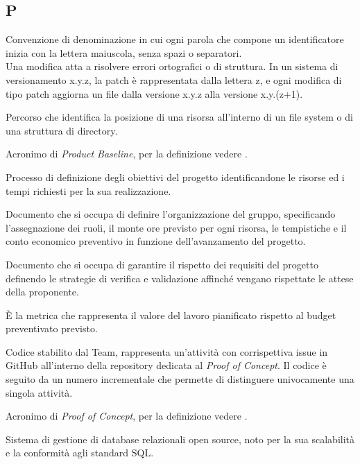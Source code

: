 \begin{center}
\section*{P}
\end{center}

Convenzione di denominazione in cui ogni parola che compone un identificatore inizia con la lettera maiuscola, senza spazi o separatori.\\

Una modifica atta a risolvere errori ortografici o di struttura. In un sistema di versionamento x.y.z, la patch è rappresentata dalla lettera z, e ogni modifica di tipo patch aggiorna un file dalla versione x.y.z alla versione x.y.(z+1).

Percorso che identifica la posizione di una risorsa all’interno di un file system o di una struttura di directory.

Acronimo di \textit{Product Baseline}, per la definizione vedere .

Processo di definizione degli obiettivi del progetto identificandone le risorse ed i tempi richiesti per la sua realizzazione.

Documento che si occupa di definire l'organizzazione del gruppo, specificando l'assegnazione dei ruoli, il monte ore previsto per ogni risorsa, le tempistiche e il conto economico preventivo in funzione dell'avanzamento del progetto.

Documento che si occupa di garantire il rispetto dei requisiti del progetto definendo le strategie di verifica e validazione affinché vengano rispettate le attese della proponente.

È la metrica che rappresenta il valore del lavoro pianificato rispetto al budget preventivato previsto.

Codice stabilito dal Team, rappresenta un’attività con corrispettiva issue in GitHub all’interno della repository dedicata al \textit{Proof of Concept}. Il codice è seguito da un numero incrementale che permette di distinguere univocamente una singola attività.

Acronimo di \textit{Proof of Concept}, per la definizione vedere .

Sistema di gestione di database relazionali open source, noto per la sua scalabilità e la conformità agli standard SQL.

